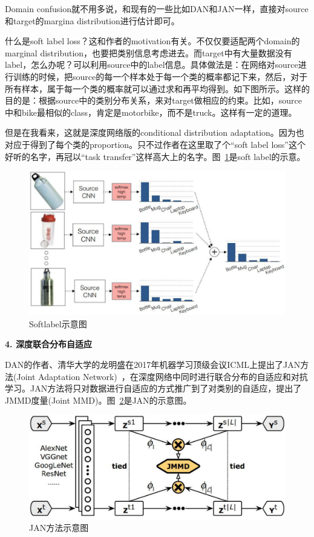 Domain confusion就不用多说，和现有的一些比如DAN和JAN一样，直接对source和target的margina distribution进行估计即可。

什么是soft label loss？这和作者的motivation有关。不仅仅要适配两个domain的marginal distribution，也要把类别信息考虑进去。而target中有大量数据没有label，怎么办呢？可以利用source中的label信息。具体做法是：在网络对source进行训练的时候，把source的每一个样本处于每一个类的概率都记下来，然后，对于所有样本，属于每一个类的概率就可以通过求和再平均得到。如下图所示。这样的目的是：根据source中的类别分布关系，来对target做相应的约束。比如，source中和bike最相似的class，肯定是motorbike，而不是truck。这样有一定的道理。

但是在我看来，这就是深度网络版的conditional distribution adaptation。因为也对应于得到了每个类的proportion。只不过作者在这里取了个“soft label loss”这个好听的名字，再冠以“task transfer”这样高大上的名字。图~\ref{fig-deep-softlabel}是soft label的示意。

\begin{figure}[htbp]
	\centering
	\includegraphics[scale=0.38]{./figures/fig-deep-softlabel.pdf}
	\caption{Softlabel示意图}
	\label{fig-deep-softlabel}
\end{figure}

\textbf{4. 深度联合分布自适应}

DAN的作者、清华大学的龙明盛在2017年机器学习顶级会议ICML上提出了JAN方法(Joint Adaptation Network)~\cite{long2017deep}，在深度网络中同时进行联合分布的自适应和对抗学习。JAN方法将只对数据进行自适应的方式推广到了对类别的自适应，提出了JMMD度量(Joint MMD)。图~\ref{fig-deep-jan}是JAN的示意图。

\begin{figure}[htbp]
	\centering
	\includegraphics[scale=0.38]{./figures/fig-deep-jan.pdf}
	\caption{JAN方法示意图}
	\label{fig-deep-jan}
\end{figure}

